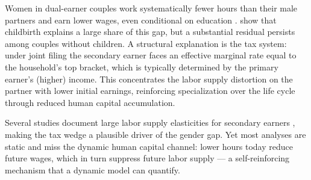 Women in dual-earner couples work systematically fewer hours than their male partners and earn lower wages, even conditional on education \citep{blau2017gender}.
\citet{kleven2019children} show that childbirth explains a large share of this gap, but a substantial residual persists among couples without children.
A structural explanation is the tax system: under joint filing the secondary earner faces an effective marginal rate equal to the household's top bracket, which is typically determined by the primary earner's (higher) income.
This concentrates the labor supply distortion on the partner with lower initial earnings, reinforcing specialization over the life cycle through reduced human capital accumulation.

Several studies document large labor supply elasticities for secondary earners \citep{bick2017taxation}, making the tax wedge a plausible driver of the gender gap.
Yet most analyses are static and miss the dynamic human capital channel: lower hours today reduce future wages, which in turn suppress future labor supply — a self-reinforcing mechanism that a dynamic model can quantify.
